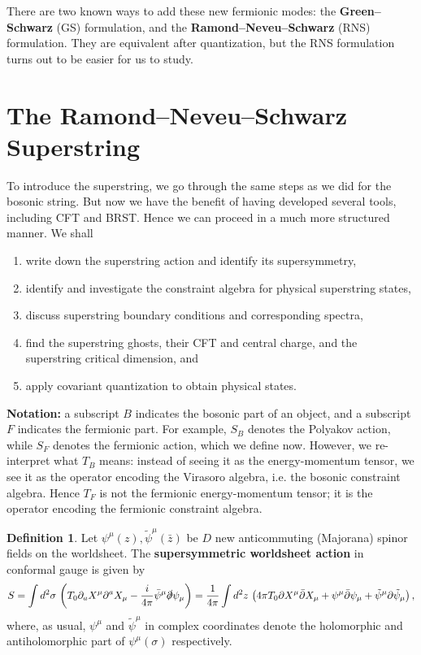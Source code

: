 \documentclass{report}
\theoremstyle{plain}
\theoremstyle{definition}
\newtheorem{definition}[theorem]{Definition}
\theoremstyle{remark}
\newcommand{\di}{\partial}
\newcommand{\bz}{\bar{z}}
\newcommand{\bdi}{\bar{\di}}
\begin{document}
There are two known ways to add these new fermionic modes: the {\bf
  Green--Schwarz} (GS) formulation, and the {\bf
  Ramond--Neveu--Schwarz} (RNS) formulation. They are equivalent after
quantization, but the RNS formulation turns out to be easier for us to
study.

\section{The Ramond--Neveu--Schwarz Superstring}

To introduce the superstring, we go through the same steps as we did
for the bosonic string. But now we have the benefit of having
developed several tools, including CFT and BRST. Hence we can proceed
in a much more structured manner. We shall
\begin{enumerate}
\item write down the superstring action and identify its
  supersymmetry,
\item identify and investigate the constraint algebra for physical
  superstring states,
\item discuss superstring boundary conditions and corresponding
  spectra,
\item find the superstring ghosts, their CFT and central charge, and
  the superstring critical dimension, and
\item apply covariant quantization to obtain physical states.
\end{enumerate}

{\bf Notation:} a subscript $B$ indicates the bosonic part of an
object, and a subscript $F$ indicates the fermionic part. For example,
$S_B$ denotes the Polyakov action, while $S_F$ denotes the fermionic
action, which we define now. However, we re-interpret what $T_B$
means: instead of seeing it as the energy-momentum tensor, we see it
as the operator encoding the Virasoro algebra, i.e. the bosonic
constraint algebra. Hence $T_F$ is not the fermionic energy-momentum
tensor; it is the operator encoding the fermionic constraint algebra.

\begin{definition}
  Let $\psi^\mu(z), \tilde{\psi}^\mu(\bz)$ be $D$ new anticommuting
  (Majorana) spinor fields on the worldsheet. The {\bf supersymmetric
    worldsheet action} in conformal gauge is given by
  \[ S = \int d^2\sigma \, \left(T_0 \di_a X^\mu \di^a X_\mu - \frac{i}{4\pi}\bar{\psi}^\mu \slashed{\di} \psi_\mu\right) = \frac{1}{4\pi}\int d^2z \, \left(4\pi T_0\di X^\mu \bdi X_\mu + \psi^\mu \bdi \psi_\mu + \tilde{\psi}^\mu \di \tilde{\psi}_\mu\right), \]
  where, as usual, $\psi^\mu$ and $\tilde{\psi}^\mu$ in complex
  coordinates denote the holomorphic and antiholomorphic part of
  $\psi^\mu(\sigma)$ respectively.
\end{definition}
\end{document}
